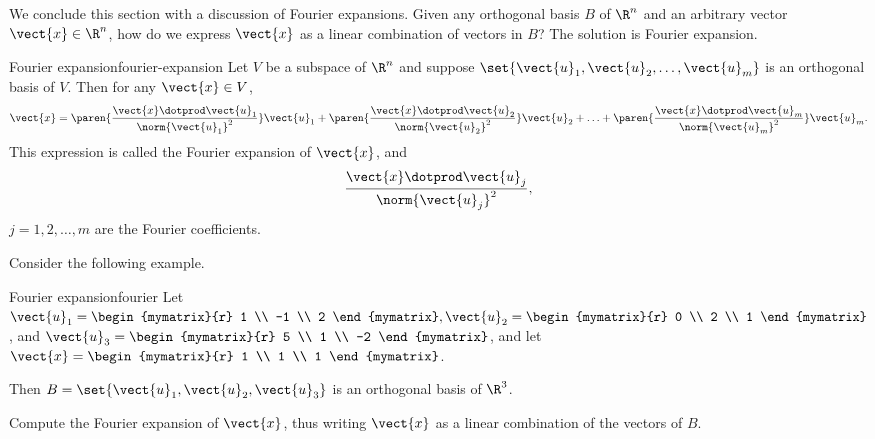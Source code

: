 We conclude this section with a discussion of Fourier expansions. Given any orthogonal basis $B$ of $\R^n$ and an arbitrary vector $\vect{x} \in \R^n$, how do we express $\vect{x}$ as a linear combination of vectors in $B$? The solution is Fourier expansion.

\begin{theorem}{Fourier expansion}{fourier-expansion}
Let $V$ be a subspace of $\R^n$ and suppose $\set{\vect{u}_1, \vect{u}_2, \ldots, \vect{u}_m}$
is an orthogonal basis of $V$.
Then for any $\vect{x}\in V$,
\[ \vect{x} =
\paren{\frac{\vect{x}\dotprod \vect{u}_1}{\norm{\vect{u}_1}^2}} \vect{u}_1 +
\paren{\frac{\vect{x}\dotprod \vect{u}_2}{\norm{\vect{u}_2}^2}} \vect{u}_2 +
\ldots +
\paren{\frac{\vect{x}\dotprod \vect{u}_m}{\norm{\vect{u}_m}^2}} \vect{u}_m.
\]
This expression is called the Fourier expansion
of $\vect{x}$, and
\[ \frac{\vect{x}\dotprod \vect{u}_j}{\norm{\vect{u}_j}^2},\]
$j=1,2,\ldots,m$
are the Fourier coefficients.
\end{theorem}

Consider the following example.

\begin{example}{Fourier expansion}{fourier}
Let
$\vect{u}_1= \begin{mymatrix}{r} 1 \\ -1 \\ 2 \end{mymatrix},
\vect{u}_2= \begin{mymatrix}{r} 0 \\ 2 \\ 1  \end{mymatrix}$,
and
$\vect{u}_3 =\begin{mymatrix}{r} 5 \\ 1 \\ -2 \end{mymatrix}$,
and let
$\vect{x} =\begin{mymatrix}{r} 1 \\ 1 \\ 1 \end{mymatrix}$.

Then $B=\set{\vect{u}_1, \vect{u}_2, \vect{u}_3}$
is an orthogonal basis of $\R^3$.

Compute the Fourier expansion of $\vect{x}$, thus writing $\vect{x}$ as  a linear combination of the vectors of $B$.
\end{example}

